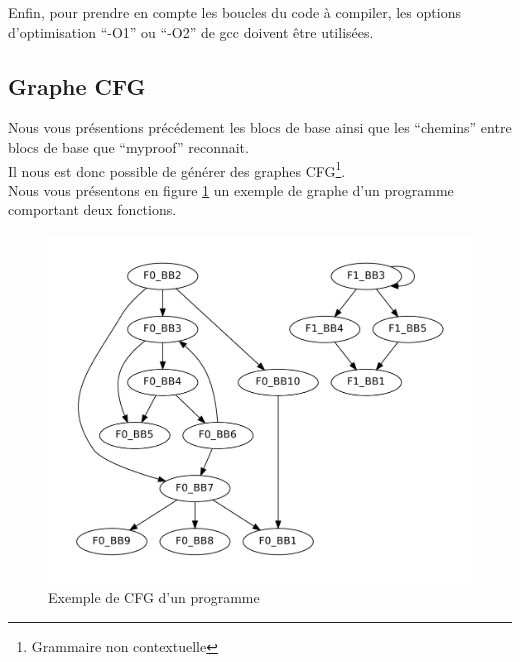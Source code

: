 Enfin, pour prendre en compte les boucles du code à compiler, les options d'optimisation ``-O1'' ou ``-O2'' de gcc doivent être utilisées.

\subsection{Graphe CFG}

Nous vous présentions précédement les blocs de base ainsi que les ``chemins'' entre blocs de base que ``myproof'' reconnait.\\

Il nous est donc possible de générer des graphes CFG\footnote{Grammaire non contextuelle}.\\

Nous vous présentons en figure \ref{fig:cfg} un exemple de graphe d'un programme comportant deux fonctions.

\begin{figure}[here]
  \centering
  \includegraphics[scale=0.50]{images/t-test.pdf}
  \caption{Exemple de CFG d'un programme}
  \label{fig:cfg}
\end{figure}
